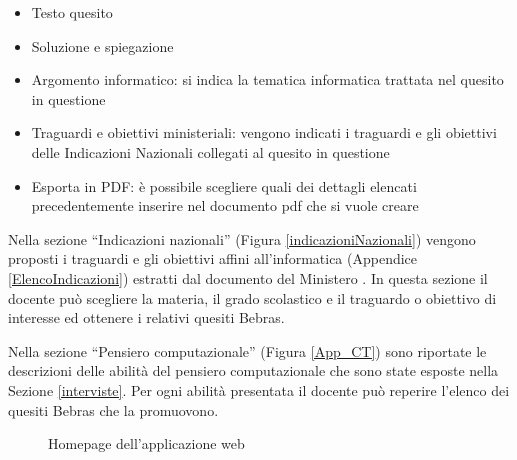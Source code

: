 \documentclass[12pt]{report}
\begin{document}
\begin{itemize}
	\item Testo quesito 
	\item Soluzione e spiegazione
	\item Argomento informatico: si indica la tematica informatica trattata nel quesito in questione
	\item Traguardi e obiettivi ministeriali: vengono indicati i traguardi e gli obiettivi delle Indicazioni Nazionali collegati al quesito in questione
	\item Esporta in PDF: è possibile scegliere quali dei dettagli elencati precedentemente inserire nel documento pdf che si vuole creare
\end{itemize}

Nella sezione ``Indicazioni nazionali'' (Figura \ref{indicazioniNazionali}) vengono proposti i traguardi e gli obiettivi affini all'informatica (Appendice \ref{ElencoIndicazioni}) estratti dal documento del Ministero \cite{indicazioniNazionali}. In questa sezione il docente può scegliere la materia, il grado scolastico e il traguardo o obiettivo di interesse ed ottenere i relativi quesiti Bebras.

Nella sezione ``Pensiero computazionale'' (Figura \ref{App_CT}) sono riportate le descrizioni delle abilità del pensiero computazionale che sono state esposte nella Sezione \ref{interviste}. Per ogni abilità presentata il docente può reperire l'elenco dei quesiti Bebras che la promuovono.

\begin{figure}[H]
	\centering
	\caption{Homepage dell'applicazione web}
	\label{App_homepage}
\end{figure}
\end{document}

